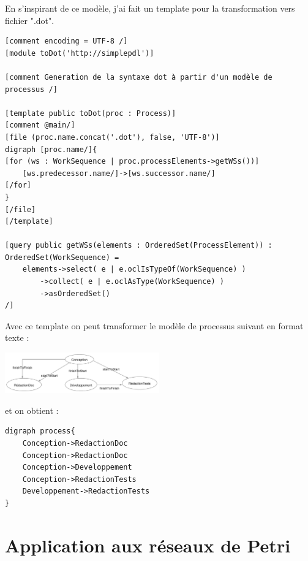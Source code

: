 En s'inspirant de ce modèle, j'ai fait un template pour la transformation vers fichier ".dot".

\begin{lstlisting}[caption=toDot.mtl]
[comment encoding = UTF-8 /]
[module toDot('http://simplepdl')]

[comment Generation de la syntaxe dot à partir d'un modèle de processus /]

[template public toDot(proc : Process)]
[comment @main/]
[file (proc.name.concat('.dot'), false, 'UTF-8')]
digraph [proc.name/]{
[for (ws : WorkSequence | proc.processElements->getWSs())]
	[ws.predecessor.name/]->[ws.successor.name/]
[/for]
}
[/file]
[/template]

[query public getWSs(elements : OrderedSet(ProcessElement)) : OrderedSet(WorkSequence) = 
	elements->select( e | e.oclIsTypeOf(WorkSequence) )
		->collect( e | e.oclAsType(WorkSequence) )
		->asOrderedSet()
/]
\end{lstlisting}

Avec ce template on peut transformer le modèle de processus suivant en format texte :

\begin{center}
\includegraphics[width = 0.5\textwidth]{../Images/tp2/tp2_2-1.png}
\end{center}

et on obtient :

\begin{lstlisting}[caption=process.dot]
digraph process{
	Conception->RedactionDoc
	Conception->RedactionDoc
	Conception->Developpement
	Conception->RedactionTests
	Developpement->RedactionTests
}
\end{lstlisting}

\section{Application aux réseaux de Petri}

